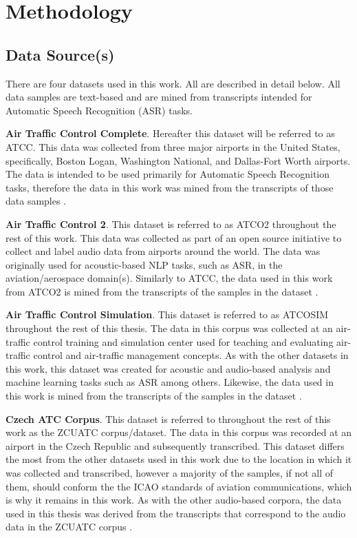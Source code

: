 \documentclass[12pt]{article}
\begin{document}
\section{Methodology}
\subsection{Data Source(s)}
There are four datasets used in this work. All are described in detail below. All data samples are text-based and are mined
from transcripts intended for Automatic Speech Recognition (ASR) tasks.

\textbf{Air Traffic Control Complete}. Hereafter this dataset will be referred to as ATCC. This data was collected from three major
airports in the United States, specifically, Boston Logan, Washington National, and Dallas-Fort Worth airports. The data is intended
to be used primarily for Automatic Speech Recognition tasks, therefore the data in this work was mined from the transcripts of those
data samples \cite{godfrey_air_1994}.

\textbf{Air Traffic Control 2}. This dataset is referred to as ATCO2 throughout the rest of this work. This data was collected as part
of an open source initiative to collect and label audio data from airports around the world. The data was originally used for
acoustic-based NLP tasks, such as ASR, in the aviation/aerospace domain(s). Similarly to ATCC, the data used in this work from ATCO2
is mined from the transcripts of the samples in the dataset \cite{szoke_detecting_2021}.

\textbf{Air Traffic Control Simulation}. This dataset is referred to as ATCOSIM throughout the rest of this thesis. The data in this
corpus was collected at an air-traffic control training and simulation center used for teaching and evaluating air-traffic control
and air-traffic management concepts. As with the other datasets in this work, this dataset was created for acoustic and audio-based
analysis and machine learning tasks such as ASR among others. Likewise, the data used in this work is mined from the transcripts
of the samples in the dataset \cite{hofbauer_atcosim_2008}.

\textbf{Czech ATC Corpus}. This dataset is referred to throughout the rest of this work as the ZCUATC corpus/dataset. The data in this
corpus was recorded at an airport in the Czech Republic and subsequently transcribed. This dataset differs the most from the other
datasets used in this work due to the location in which it was collected and transcribed, however a majority of the samples, if not all
of them, should conform the the ICAO standards of aviation communications, which is why it remains in this work. As with the other
audio-based corpora, the data used in this thesis was derived from the transcripts that correspond to the audio data in the ZCUATC
corpus \cite{smidl_air_2019}.
\end{document}

